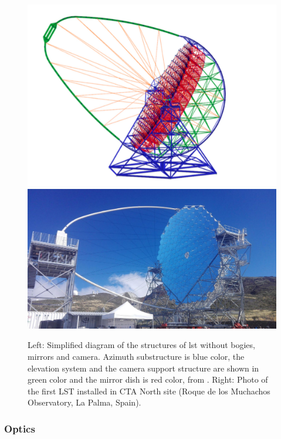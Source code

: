 \documentclass[main.tex]{subfiles}
\begin{document}
  \begin{figure}[!htb]
    \includegraphics[width=\linewidth]{Pictures/LSTstructure.pdf}
    \endminipage\hfill
    \includegraphics[width=\linewidth]{Pictures/LST1.pdf}
    \endminipage\hfill
    \caption{\label{fig:LST} Left: Simplified diagram of the structures of \gls{lst} without bogies, mirrors and camera. Azimuth substructure is blue color, the elevation system and the camera support structure are shown in green color and the mirror dish is red color, from \cite{2013LST}. Right: Photo of the first LST installed in CTA North site (Roque de los Muchachos Observatory, La Palma, Spain).}
  \end{figure}

  \subsubsection{Optics}
\end{document}
